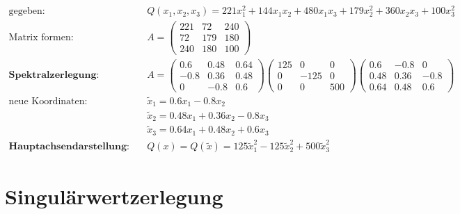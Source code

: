 \documentclass[11pt]{article}
\begin{document}
\begin{equation*}
\begin{split}
	\text{gegeben:} \quad & Q(x_1, x_2, x_3) = 221x_1^2 + 144x_1x_2 + 480x_1x_3 + 179x_2^2 + 360 x_2x_3 + 100x_3^2 \\
	\text{Matrix formen:} \quad & A = \begin{pmatrix}
		221 & 72 & 240 \\ 72 & 179 & 180 \\ 240 & 180 & 100
	\end{pmatrix} \\
	\textbf{Spektralzerlegung:} \quad & A = \begin{pmatrix}
		0.6 & 0.48 & 0.64 \\ -0.8 & 0.36 & 0.48 \\ 0 & -0.8 & 0.6
	\end{pmatrix} \begin{pmatrix}
		125 & 0 & 0 \\ 0 & -125 & 0 \\ 0 & 0 & 500
	\end{pmatrix} \begin{pmatrix}
		0.6 & -0.8 & 0 \\ 0.48 & 0.36 & -0.8 \\ 0.64 & 0.48 & 0.6
	\end{pmatrix} \\
	\text{neue Koordinaten:} \quad & \tilde x_1 = 0.6 x_1 - 0.8x_2 \\
	& \tilde x_2 = 0.48 x_1 + 0.36x_2 - 0.8x_3 \\
	& \tilde x_3 = 0.64x_1 + 0.48 x_2 + 0.6x_3 \\
	\textbf{Hauptachsendarstellung:} \quad & Q(x) = Q(\tilde x) = 125 \tilde x_1^2 -125\tilde x_2^2 + 500 \tilde x_3^2
\end{split}
\end{equation*}

\section{Singul{\"a}rwertzerlegung}
\end{document}
